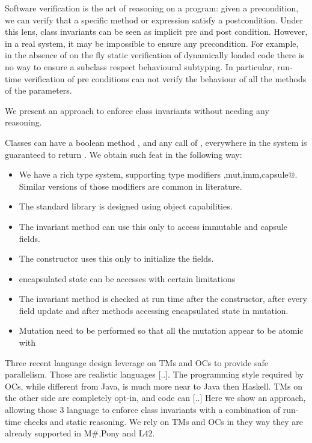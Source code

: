 
Software verification is the art of reasoning 
on a program: given a precondition, 
we can verify that a specific method or expression
satisfy a postcondition.
Under this lens, class invariants can be seen as implicit pre and post condition.
However, in a real system, it may be impossible to ensure any precondition. For example, 
in the absence of on the fly static verification of dynamically loaded code there is no way to ensure a
subclass respect behavioural subtyping.
In particular, run-time verification of pre conditions can not verify the behaviour of all the methods of the parameters.

We present an approach to enforce class invariants without needing any reasoning.

Classes can have a boolean method \Q@invariant@,
and any call of \Q@invariant@, everywhere in the system is guaranteed to return \Q@true@.
We obtain such feat in the following way:
\begin{itemize}
	\item We have a rich type system, supporting type modifiers \Q@read,mut,imm,capsule@. Similar versions of those modifiers are common in literature.
	\item The standard library is designed using object capabilities.
	\item The invariant method can use this only to access immutable and capsule fields.
	\item The constructor uses this only to initialize the fields.
	\item encapsulated state can be accesses with certain limitations
	\item The invariant method is checked at run time after the constructor, after every field update and
	after methods accessing encapsulated state in mutation.
	\item Mutation need to be performed so that all the mutation appear to be atomic with 
\end{itemize}
\LINE

Three recent language design leverage on TMs and OCs to provide safe parallelism.
Those are realistic languages [..].
The programming style required by OCs, while different from Java, is much more near to Java then Haskell. TMs on the other side are completely opt-in, and code can [..]
Here we show an approach, allowing those 3 language 
to  enforce class invariants with a combination of run-time checks and static reasoning.
We rely on TMs and OCs in they way they are already supported in M\#,Pony and L42.

